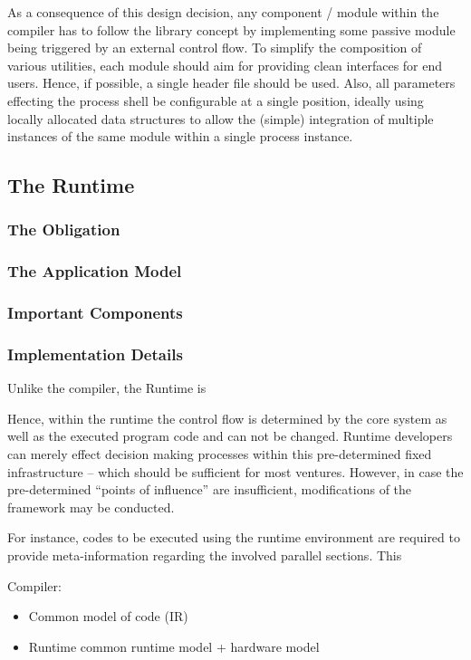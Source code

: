 As a consequence of this design decision, any component / module within the
compiler has to follow the library concept by implementing some passive module
being triggered by an external control flow. To simplify the composition of
various utilities, each module should aim for providing clean interfaces for end
users. Hence, if possible, a single header file should be used. Also, all
parameters effecting the process shell be configurable at a single position,
ideally using locally allocated data structures to allow the (simple)
integration of multiple instances of the same module within a single process
instance.


\subsection{The Runtime}

\subsubsection{The Obligation}
\subsubsection{The Application Model}
\subsubsection{Important Components}
\subsubsection{Implementation Details}
Unlike the compiler, the Runtime is 

Hence, within the runtime the control flow is determined by the core
system as well as the executed program code and can not be changed. Runtime
developers can merely effect decision making processes within this
pre-determined fixed infrastructure -- which should be sufficient for most
ventures. However, in case the pre-determined ``points of influence'' are
insufficient, modifications of the framework may be conducted.


For instance,
codes to be executed using the runtime environment are required to provide
meta-information regarding the involved parallel sections. This
 



Compiler:
\begin{itemize}
  \item Common model of code (IR)
  \item Runtime common runtime model + hardware model
\end{itemize}

